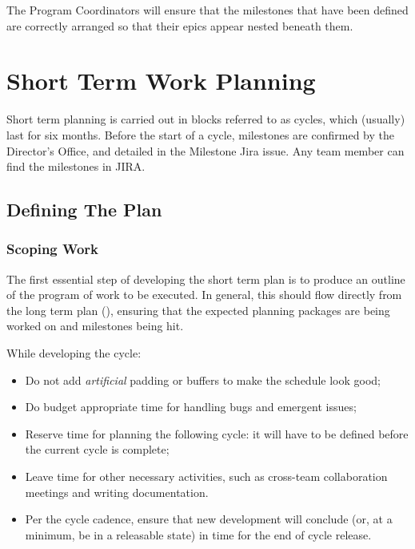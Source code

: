 The Program Coordinators will ensure that the milestones that have been defined are correctly arranged so that their epics appear nested beneath them.


\section{Short Term Work Planning} \label{sec:cycle-plan}

Short term planning is carried out in blocks referred to as \glspl{cycle}, which (usually) last for six months.
Before the start of a \gls{cycle}, milestones are confirmed by the \gls{Director}'s Office, and detailed in the Milestone Jira issue. Any team member can find the milestones in \gls{JIRA}.

\subsection{Defining The Plan}

\subsubsection{Scoping Work}

The first essential step of developing the short term plan is to produce an outline of the program of work to be executed.
In general, this should flow directly from the long term plan (), ensuring that the expected planning packages are being worked on and milestones being hit.

While developing the \gls{cycle}:

\begin{itemize}
\item Do not add \emph{artificial} padding or buffers to make the schedule look good;
\item Do budget appropriate time for handling bugs and emergent issues;
\item Reserve time for planning the following \gls{cycle}: it will have to be defined before the current \gls{cycle} is complete;
\item Leave time for other necessary activities, such as cross-team collaboration meetings and writing documentation.
\item Per the \gls{cycle} \gls{cadence}, ensure that new development will conclude (or, at a minimum, be in a releasable state) in time for the end of \gls{cycle} release.
\end{itemize}

